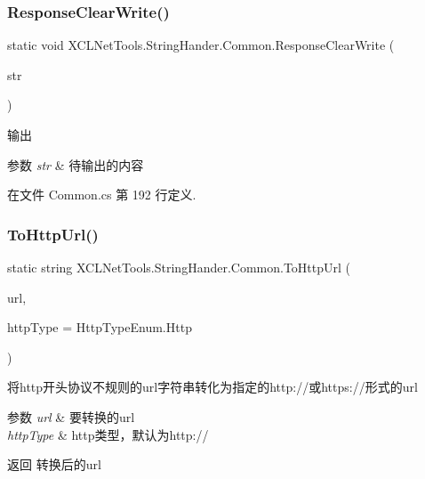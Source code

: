 \subsubsection{\texorpdfstring{Response\+Clear\+Write()}{ResponseClearWrite()}}
{\footnotesize\ttfamily static void X\+C\+L\+Net\+Tools.\+String\+Hander.\+Common.\+Response\+Clear\+Write (\begin{DoxyParamCaption}\item[{string}]{str }\end{DoxyParamCaption})\hspace{0.3cm}{\ttfamily [static]}}



输出 


\begin{DoxyParams}{参数}
{\em str} & 待输出的内容\\
\hline
\end{DoxyParams}


在文件 Common.\+cs 第 192 行定义.

\mbox{\label{class_x_c_l_net_tools_1_1_string_hander_1_1_common_ae66c8e05d6326deb1b9c669df9e4e4de}} 
\subsubsection{\texorpdfstring{To\+Http\+Url()}{ToHttpUrl()}}
{\footnotesize\ttfamily static string X\+C\+L\+Net\+Tools.\+String\+Hander.\+Common.\+To\+Http\+Url (\begin{DoxyParamCaption}\item[{string}]{url,  }\item[{Http\+Type\+Enum}]{http\+Type = {\ttfamily HttpTypeEnum.Http} }\end{DoxyParamCaption})\hspace{0.3cm}{\ttfamily [static]}}



将http开头协议不规则的url字符串转化为指定的http\+://或https\+://形式的url 


\begin{DoxyParams}{参数}
{\em url} & 要转换的url\\
\hline
{\em http\+Type} & http类型，默认为http\+://\\
\hline
\end{DoxyParams}
\begin{DoxyReturn}{返回}
转换后的url
\end{DoxyReturn}


